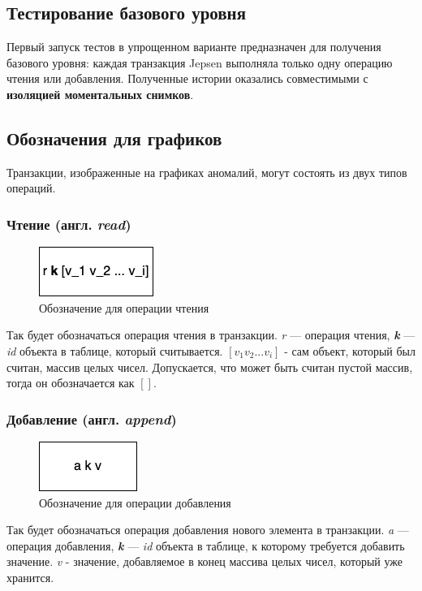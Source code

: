 \documentclass[14pt,  openany]{book}
\begin{document}
\subsection{Тестирование базового уровня}
Первый запуск тестов в упрощенном варианте предназначен для получения базового уровня: каждая транзакция Jepsen выполняла только одну операцию чтения или добавления.
Полученные истории оказались совместимыми с \textbf{изоляцией моментальных снимков}.

\subsection{Обозначения для графиков}
Транзакции, изображенные на графиках аномалий, могут состоять из двух типов операций.
\subsubsection{Чтение (англ. \textit{read})}
\begin{figure}[H]
\centering
  \includegraphics[scale=1.0]{images/read.png}
  \caption{Обозначение для операции чтения}
\end{figure}
Так будет обозначаться операция чтения в транзакции. \textit{r} --- операция чтения, \textit{\textbf{k}} --- \textit{id} объекта в таблице, который считывается. $[v_1 v_2 ... v_i]$ - сам объект, который был считан, массив целых чисел. Допускается, что может быть считан пустой массив, тогда он обозначается как $[]$.

\subsubsection{Добавление (англ. \textit{append})}
\begin{figure}[H]
\centering
  \includegraphics[scale=1.0]{images/append.png}
  \caption{Обозначение для операции добавления}
\end{figure}
Так будет обозначаться операция добавления нового элемента в транзакции. \textit{a} --- операция добавления, \textit{\textbf{k}} --- \textit{id} объекта в таблице,  к которому требуется добавить значение. \textit{v} - значение, добавляемое в конец массива целых чисел, который уже хранится.
\end{document}
